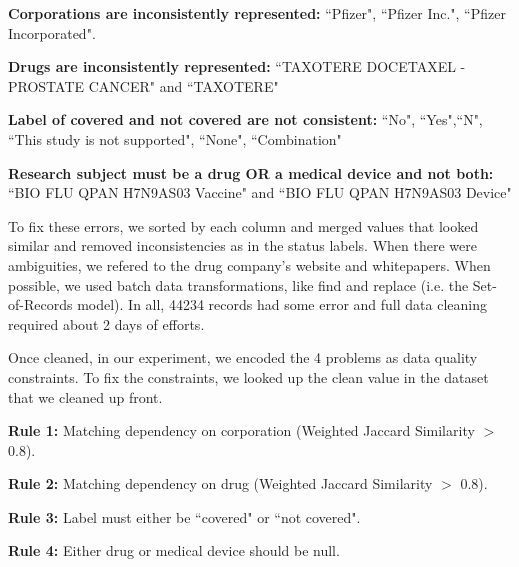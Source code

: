 \noindent \textbf{Corporations are inconsistently represented: } ``Pfizer", ``Pfizer Inc.", ``Pfizer Incorporated".

\vspace{0.25em}

\noindent \textbf{Drugs are inconsistently represented: } ``TAXOTERE  DOCETAXEL -PROSTATE CANCER" and ``TAXOTERE"

\vspace{0.25em}

\noindent \textbf{Label of covered and not covered are not consistent: } ``No", ``Yes",``N", ``This study is not supported", ``None", ``Combination"

\vspace{0.25em} 

\noindent \textbf{Research subject must be a drug OR a medical device and not both: } ``BIO FLU QPAN H7N9AS03 Vaccine" and ``BIO FLU QPAN H7N9AS03 Device"

\vspace{0.5em} 

To fix these errors, we sorted by each column and merged values that looked similar and removed inconsistencies as in the status labels. 
When there were ambiguities, we refered to the drug company's website and whitepapers.
When possible, we used batch data transformations, like find and replace (i.e. the Set-of-Records model).
In all, 44234 records had some error and full data cleaning required about 2 days of efforts.

Once cleaned, in our experiment, we encoded the 4 problems as data quality constraints.
To fix the constraints, we looked up the clean value in the dataset that we cleaned up front.

\vspace{0.25em}

\noindent \textbf{Rule 1: } Matching dependency on corporation (Weighted Jaccard Similarity $>$ 0.8).

\vspace{0.25em}

\noindent \textbf{Rule 2: } Matching dependency on drug (Weighted Jaccard Similarity $>$ 0.8).

\vspace{0.25em}

\noindent \textbf{Rule 3: } Label must either be ``covered" or ``not covered".

\vspace{0.25em} 

\noindent \textbf{Rule 4: } Either drug or medical device should be null.

